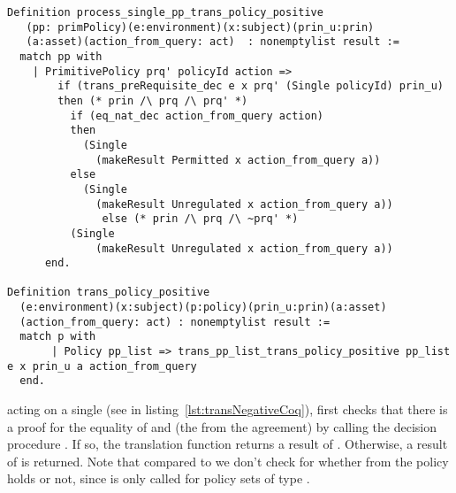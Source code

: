 \begin{minipage}{\linewidth}
\begin{lstlisting}
Definition process_single_pp_trans_policy_positive 
   (pp: primPolicy)(e:environment)(x:subject)(prin_u:prin)
   (a:asset)(action_from_query: act)  : nonemptylist result :=
  match pp with
    | PrimitivePolicy prq' policyId action =>
        if (trans_preRequisite_dec e x prq' (Single policyId) prin_u)
        then (* prin /\ prq /\ prq' *)
          if (eq_nat_dec action_from_query action)
          then
            (Single 
              (makeResult Permitted x action_from_query a))
          else
            (Single 
              (makeResult Unregulated x action_from_query a))
               else (* prin /\ prq /\ ~prq' *)
          (Single 
              (makeResult Unregulated x action_from_query a))
      end.

Definition trans_policy_positive
  (e:environment)(x:subject)(p:policy)(prin_u:prin)(a:asset)
  (action_from_query: act) : nonemptylist result :=
  match p with
       | Policy pp_list => trans_pp_list_trans_policy_positive pp_list e x prin_u a action_from_query
  end.

\end{lstlisting}
\end{minipage}


 acting on a single  (see  in listing~\ref{lst:transNegativeCoq}), first checks that there is a proof for the equality of  and  (the  from the agreement) by calling the decision procedure . If so, the translation function returns a result of . Otherwise, a result of  is returned. Note that compared to  we don't check for whether  from the policy holds or not, since  is only called for policy sets of type .


